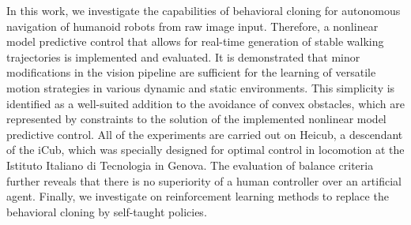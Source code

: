 In this work, we investigate the capabilities of behavioral cloning for autonomous navigation of humanoid robots from raw image input. Therefore, a nonlinear model predictive control that allows for real-time generation of stable walking trajectories is implemented and evaluated. It is demonstrated that minor modifications in the vision pipeline are sufficient for the learning of versatile motion strategies in various dynamic and static environments. This simplicity is identified as a well-suited addition to the avoidance of convex obstacles, which are represented by constraints to the solution of the implemented nonlinear model predictive control. All of the experiments are carried out on Heicub, a descendant of the iCub, which was specially designed for optimal control in locomotion at the Istituto Italiano di Tecnologia in Genova. The evaluation of balance criteria further reveals that there is no superiority of a human controller over an artificial agent. Finally, we investigate on reinforcement learning methods to replace the behavioral cloning by self-taught policies.
